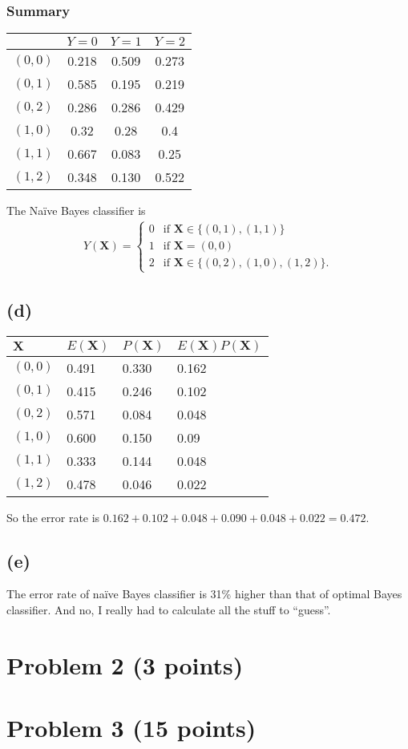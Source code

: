 \documentclass[10pt]{article}
\begin{document}
\subsubsection*{Summary}
\begin{tabular}[H]{|l|c|c|c|}
  \hline
  & $Y = 0$ & $Y = 1$ & $Y = 2$ \\
  \hline
  $(0, 0)$ & 0.218 & 0.509 & 0.273 \\
  \hline
  $(0, 1)$ & 0.585 & 0.195 & 0.219 \\
  \hline
  $(0, 2)$ & 0.286 & 0.286 & 0.429 \\
  \hline
  $(1, 0)$ & 0.32 & 0.28 & 0.4 \\
  \hline
  $(1, 1)$ & 0.667 & 0.083 & 0.25 \\
  \hline
  $(1, 2)$ & 0.348 & 0.130 & 0.522 \\
  \hline
\end{tabular}

The Naïve Bayes classifier is
\begin{align*}
Y(\textbf{X}) = \begin{cases}
0 & \mbox{if } \textbf{X} \in \{ (0, 1), (1, 1) \} \\ 
1 & \mbox{if } \textbf{X} =  (0, 0) \\
2 & \mbox{if } \textbf{X} \in \{ (0, 2), (1, 0), (1, 2) \}.
\end{cases}
\end{align*}

\subsection*{(d)}
\begin{tabular}[H]{|l|l|l|l|}
\hline
$\textbf{X}$ & $E(\textbf{X})$ & $P(\textbf{X})$ & $E(\textbf{X})P(\textbf{X})$ \\
\hline
$(0, 0)$ & 0.491 & 0.330 & 0.162 \\
\hline
$(0, 1)$ & 0.415 & 0.246 & 0.102 \\
\hline
$(0, 2)$ & 0.571  & 0.084 & 0.048 \\
\hline
$(1, 0)$ & 0.600  & 0.150 & 0.09 \\
\hline
$(1, 1)$ & 0.333  & 0.144 & 0.048 \\
\hline
$(1, 2)$ & 0.478 &  0.046 & 0.022 \\
\hline
\end{tabular}
So the error rate is $0.162 + 0.102 + 0.048 + 0.090 + 0.048 + 0.022 = 0.472$.

\subsection*{(e)}
The error rate of naïve Bayes classifier is 31\% higher than that of optimal Bayes classifier. And no, I really had to calculate all the stuff to ``guess''.
\section*{Problem 2 (3 points)}

\section*{Problem 3 (15 points)}
\end{document}
